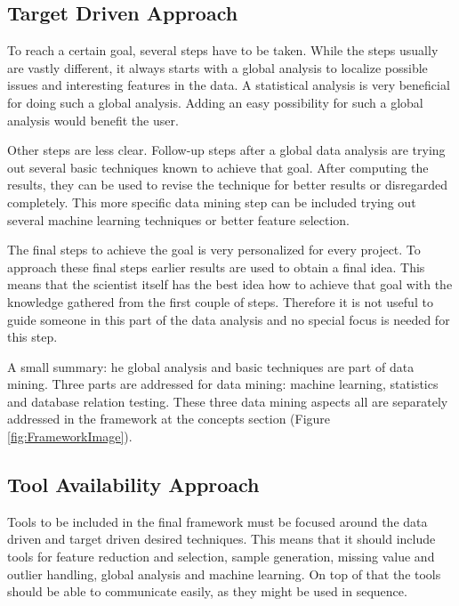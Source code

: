 \documentclass[10pt,a4paper]{article}
\begin{document}
	\subsection{Target Driven Approach}
	\label{subsec:TargetDrivenApproach}
	
	To reach a certain goal, several steps have to be taken. While the steps usually are vastly different, it always starts with a global analysis to localize possible issues and interesting features in the data. A statistical analysis is very beneficial for doing such a global analysis. Adding an easy possibility for such a global analysis would benefit the user.
	
	Other steps are less clear. Follow-up steps after a global data analysis are trying out several basic techniques known to achieve that goal. After computing the results, they can be used to revise the technique for better results or disregarded completely. This more specific data mining step can be included trying out several machine learning techniques or better feature selection.
	
	The final steps to achieve the goal is very personalized for every project. To approach these final steps earlier results are used to obtain a final idea. This means that the scientist itself has the best idea how to achieve that goal with the knowledge gathered from the first couple of steps. Therefore it is not useful to guide someone in this part of the data analysis and no special focus is needed for this step.
	
	A small summary: he global analysis and basic techniques are part of data mining. Three parts are addressed for data mining: machine learning, statistics and database relation testing. These three data mining aspects all are separately addressed in the framework at the concepts section (Figure \ref{fig:FrameworkImage}).
		
	\subsection{Tool Availability Approach}
	\label{subsec:ToolAvailabilityDrivenApproach}
	
	Tools to be included in the final framework must be focused around the data driven and target driven desired techniques. This means that it should include tools for feature reduction and selection, sample generation, missing value and outlier handling, global analysis and machine learning. On top of that the tools should be able to communicate easily, as they might be used in sequence.
	
\end{document}
